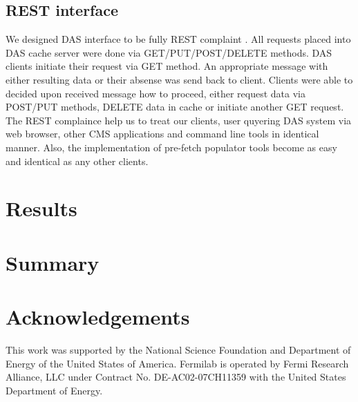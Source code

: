 \documentclass[a4paper]{jpconf}
\begin{document}
\subsection{REST interface}
We designed DAS interface to be fully REST complaint \cite{REST}.
All requests placed into DAS cache server were done via GET/PUT/POST/DELETE methods.
DAS clients initiate their request via GET method. An appropriate message
with either resulting data or their absense was send back to client.
Clients were able to decided upon received message how to proceed, either
request data via POST/PUT methods, DELETE data in cache or initiate another
GET request. The REST complaince help us to treat our clients, user quyering
DAS system via web browser, other CMS applications and command line tools
in identical manner. Also, the implementation of pre-fetch populator
tools become as easy and identical as any other clients.

\section{Results\label{Results}}

\section{Summary}

\section{Acknowledgements}

This work was supported by the National Science Foundation and Department of Energy of the United States of America. Fermilab is operated by Fermi Research Alliance, LLC under Contract
No. DE-AC02-07CH11359 with the United States Department of Energy.
\end{document}
